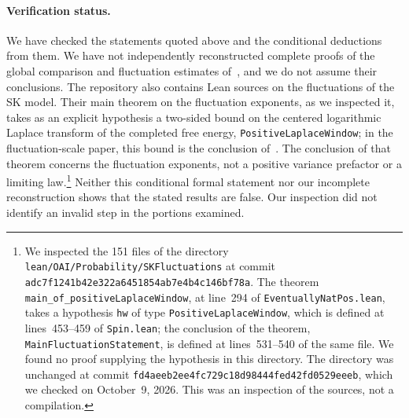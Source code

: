 \paragraph{Verification status.}
We have checked the statements quoted above and the conditional
deductions from them. We have not independently reconstructed complete
proofs of the global comparison and fluctuation estimates
of~\cite{OpenAIFluctuationScale,OpenAILimitingLaw}, and we do not
assume their conclusions. The repository also contains Lean sources on
the fluctuations of the SK model. Their main theorem on the fluctuation
exponents, as we inspected it, takes as an explicit hypothesis a
two-sided bound on the centered logarithmic Laplace transform of the
completed free energy, \texttt{PositiveLaplaceWindow}; in the
fluctuation-scale paper, this bound is the conclusion
of~\cite[Proposition~7.5]{OpenAIFluctuationScale}. The conclusion of
that theorem concerns the fluctuation exponents, not a positive variance
prefactor or a limiting law.\footnote{We inspected the 151 files of the
directory \nolinkurl{lean/OAI/Probability/SKFluctuations} at commit
\nolinkurl{adc7f1241b42e322a6451854ab7e4b4c146bf78a}. The theorem
\nolinkurl{main_of_positiveLaplaceWindow}, at line~294 of
\nolinkurl{EventuallyNatPos.lean}, takes a hypothesis
\texttt{hw} of type \nolinkurl{PositiveLaplaceWindow}, which is defined at
lines~453--459 of \nolinkurl{Spin.lean}; the conclusion of the
theorem, \nolinkurl{MainFluctuationStatement}, is defined at
lines~531--540 of the same file. We found no proof supplying the
hypothesis in this directory. The directory was unchanged at commit
\nolinkurl{fd4aeeb2ee4fc729c18d98444fed42fd0529eeeb}, which we checked on
October~9, 2026. This was an inspection of the sources, not a
compilation.} Neither this conditional formal statement nor our
incomplete reconstruction shows that the stated results are false.
Our inspection did not identify an invalid step in the portions
examined.

